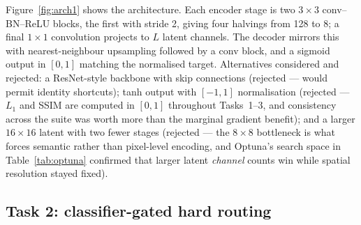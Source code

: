 \documentclass[journal]{IEEEtran}
\begin{document}
Figure~\ref{fig:arch1} shows the architecture. Each encoder stage is two $3\times3$ conv--BN--ReLU blocks, the first with stride 2, giving four halvings from 128 to 8; a final $1\times1$ convolution projects to $L$ latent channels. The decoder mirrors this with nearest-neighbour upsampling followed by a conv block, and a sigmoid output in $[0,1]$ matching the normalised target. Alternatives considered and rejected: a ResNet-style backbone with skip connections (rejected --- would permit identity shortcuts); tanh output with $[-1,1]$ normalisation (rejected --- $L_1$ and SSIM are computed in $[0,1]$ throughout Tasks~1--3, and consistency across the suite was worth more than the marginal gradient benefit); and a larger $16\times16$ latent with two fewer stages (rejected --- the $8\times8$ bottleneck is what forces semantic rather than pixel-level encoding, and Optuna's search space in Table~\ref{tab:optuna} confirmed that larger latent \emph{channel} counts win while spatial resolution stayed fixed).

\subsection{Task 2: classifier-gated hard routing}
\label{sec:arch2}
\end{document}
